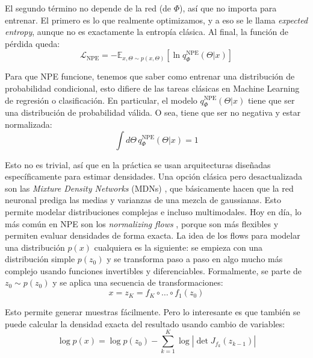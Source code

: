 El segundo término no depende de la red (de $\Phi$), así que no importa para entrenar. El primero es lo que realmente optimizamos, y a eso se le llama \textit{expected entropy}, aunque no es exactamente la entropía clásica. Al final, la función de pérdida queda:
\begin{equation}
\mathcal{L}_{\text{NPE}} = - \mathbb{E}_{x,\Theta \sim p(x,\Theta)} 
\left[ \ln q_{\Phi}^{\text{NPE}}(\Theta|x) \right]
\label{eq:loss_npe}
\end{equation}

Para que NPE funcione, tenemos que saber como entrenar una distribución de probabilidad condicional, esto difiere de las tareas clásicas en Machine Learning de regresión o clasificación. En particular, el modelo $q_{\Phi}^{\text{NPE}}(\Theta|x)$ tiene que ser una distribución de probabilidad válida. O sea, tiene que ser no negativa y estar normalizada:
\begin{equation}
\int d\Theta \, q_{\Phi}^{\text{NPE}}(\Theta|x) = 1
\end{equation}

Esto no es trivial, así que en la práctica se usan arquitecturas diseñadas específicamente para estimar densidades. Una opción clásica pero desactualizada son las \textit{Mixture Density Networks} (MDNs) \cite{bishop1994}, que básicamente hacen que la red neuronal prediga las medias y varianzas de una mezcla de gaussianas. Esto permite modelar distribuciones complejas e incluso multimodales. Hoy en día, lo más común en NPE son los \textit{normalizing flows} \cite{papamakarios2021}, porque son más flexibles y permiten evaluar densidades de forma exacta. La idea de los flows para modelar una distribución $p(x)$ cualquiera es la siguiente: se empieza con una distribución simple $p(z_0)$ y se transforma paso a paso en algo mucho más complejo usando funciones invertibles y diferenciables. Formalmente, se parte de $z_0 \sim p(z_0)$ y se aplica una secuencia de transformaciones:
\begin{equation}
x = z_K = f_K \circ \dots \circ f_1 (z_0)
\end{equation}

Esto permite generar muestras fácilmente. Pero lo interesante es que también se puede calcular la densidad exacta del resultado usando cambio de variables:
\begin{equation}
\log p(x) = \log p(z_0) - \sum_{k=1}^{K} \log \left| \det J_{f_k}(z_{k-1}) \right|
\end{equation}

